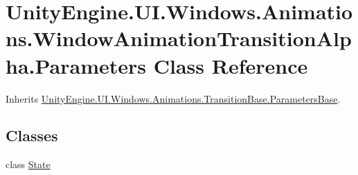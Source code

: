 \hypertarget{class_unity_engine_1_1_u_i_1_1_windows_1_1_animations_1_1_window_animation_transition_alpha_1_1_parameters}{}\section{Unity\+Engine.\+U\+I.\+Windows.\+Animations.\+Window\+Animation\+Transition\+Alpha.\+Parameters Class Reference}
\label{class_unity_engine_1_1_u_i_1_1_windows_1_1_animations_1_1_window_animation_transition_alpha_1_1_parameters}


Inherits \hyperlink{class_unity_engine_1_1_u_i_1_1_windows_1_1_animations_1_1_transition_base_1_1_parameters_base}{Unity\+Engine.\+U\+I.\+Windows.\+Animations.\+Transition\+Base.\+Parameters\+Base}.

\subsection*{Classes}
\begin{DoxyCompactItemize}
\item 
class \hyperlink{class_unity_engine_1_1_u_i_1_1_windows_1_1_animations_1_1_window_animation_transition_alpha_1_1_parameters_1_1_state}{State}
\end{DoxyCompactItemize}

